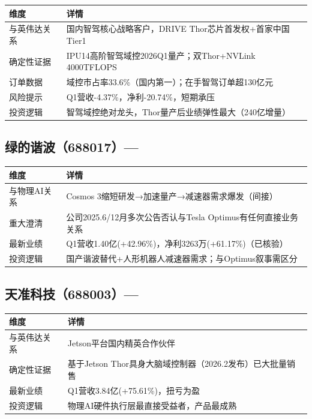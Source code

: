 \begin{table}[H]
\centering\small
\renewcommand{\arraystretch}{1.3}
\begin{tabularx}{\textwidth}{l X}
\toprule
\textbf{维度} & \textbf{详情} \\
\midrule
与英伟达关系 & 国内智驾核心战略客户，DRIVE Thor芯片首发权+首家中国Tier1 \\
确定性证据 & IPU14高阶智驾域控2026Q1量产；双Thor+NVLink 4000TFLOPS \\
订单数据 & 域控市占率33.6\%（国内第一）；在手智驾订单超130亿元 \\
风险提示 & Q1营收-4.37\%，净利-20.74\%，短期承压 \\
投资逻辑 & 智驾域控绝对龙头，Thor量产后业绩弹性最大（240亿增量） \\
\bottomrule
\end{tabularx}
\end{table}

\subsection{绿的谐波（688017）--- \starfour{}}

\begin{table}[H]
\centering\small
\renewcommand{\arraystretch}{1.3}
\begin{tabularx}{\textwidth}{l X}
\toprule
\textbf{维度} & \textbf{详情} \\
\midrule
与物理AI关系 & Cosmos 3缩短研发→加速量产→减速器需求爆发（间接） \\
重大澄清 & \textcolor{riskred}{公司2025.6/12月多次公告否认与Tesla Optimus有任何直接业务关系} \\
最新业绩 & Q1营收1.40亿(+42.96\%)，净利3263万(+61.17\%)（已核验） \\
投资逻辑 & 国产谐波替代+人形机器人减速器需求；与Optimus叙事需区分 \\
\bottomrule
\end{tabularx}
\end{table}

\subsection{天准科技（688003）--- \starfive{}}

\begin{table}[H]
\centering\small
\renewcommand{\arraystretch}{1.3}
\begin{tabularx}{\textwidth}{l X}
\toprule
\textbf{维度} & \textbf{详情} \\
\midrule
与英伟达关系 & Jetson平台国内精英合作伙伴 \\
确定性证据 & 基于Jetson Thor具身大脑域控制器（2026.2发布）已大批量销售 \\
最新业绩 & Q1营收3.84亿(+75.61\%)，扭亏为盈 \\
投资逻辑 & 物理AI硬件执行层最直接受益者，产品最成熟 \\
\bottomrule
\end{tabularx}
\end{table}

